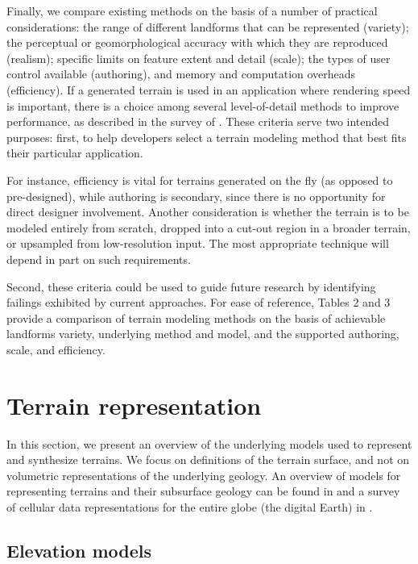 \documentclass{article}
\begin{document}
Finally, we compare existing methods on the basis of a number of practical considerations: the range of different landforms that can be represented (variety); the perceptual or geomorphological accuracy with which they are reproduced (realism); specific limits on feature extent and detail (scale); the types of user control available (authoring), and memory and computation overheads (efficiency). If a generated terrain is used in an application where rendering speed is important, there is a choice among several level-of-detail methods to improve performance, as described in the survey of \cite{PG07}. These criteria serve two intended purposes: first, to help developers select a terrain modeling method that best fits their particular application.

For instance, efficiency is vital for terrains generated on the fly (as opposed to pre-designed), while authoring is secondary, since there is no opportunity for direct designer involvement. Another consideration is whether the terrain is to be modeled entirely from scratch, dropped into a cut-out region in a broader terrain, or upsampled from low-resolution input. The most appropriate technique will depend in part on such requirements.

Second, these criteria could be used to guide future research by identifying failings exhibited by current approaches. For ease of reference, Tables 2 and 3 provide a comparison of terrain modeling methods on the basis of achievable landforms variety, underlying method and model, and the supported authoring, scale, and efficiency.

\section{Terrain representation}

In this section, we present an overview of the underlying models used to represent and synthesize terrains. We focus on definitions of the terrain surface, and not on volumetric representations of the underlying geology. An overview of models for representing terrains and their subsurface geology can be found in \cite{NLP13} and a survey of cellular data representations for the entire globe (the digital Earth) in \cite{MAAS15}.

\subsection{Elevation models}
\end{document}
